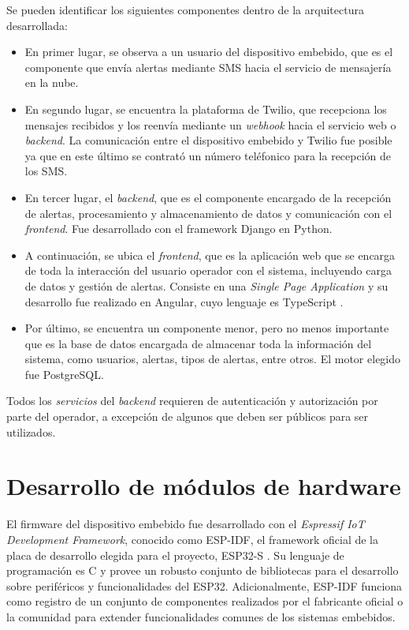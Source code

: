 Se pueden identificar los siguientes componentes dentro de la arquitectura desarrollada:
\begin{itemize}
	\item En primer lugar, se observa a un usuario del dispositivo embebido, que es el componente que envía alertas mediante SMS hacia el servicio de mensajería en la nube.
	\item En segundo lugar, se encuentra la plataforma de Twilio, que recepciona los mensajes recibidos y los reenvía mediante un \textit{webhook} hacia el servicio web o \textit{backend}. La comunicación entre el dispositivo embebido y Twilio fue posible ya que en este último se contrató un número teléfonico para la recepción de los SMS. 
	\item En tercer lugar, el \textit{backend}, que es el componente encargado de la recepción de alertas, procesamiento y almacenamiento de datos y comunicación con el \textit{frontend}. Fue desarrollado con el framework Django en Python.
	\item A continuación, se ubica el \textit{frontend}, que es la aplicación web que se encarga de toda la interacción del usuario operador con el sistema, incluyendo carga de datos y gestión de alertas. Consiste en una \textit{Single Page Application } y su desarrollo fue realizado en Angular, cuyo lenguaje es TypeScript \citep{ANGULAR:1}.
	\item Por último, se encuentra un componente menor, pero no menos importante que es la base de datos encargada de almacenar toda la información del sistema, como usuarios, alertas, tipos de alertas, entre otros. El motor elegido fue PostgreSQL.
\end{itemize}

Todos los \textit{servicios} del \textit{backend} requieren de autenticación y autorización por parte del operador, a excepción de algunos que deben ser públicos para ser utilizados.
   
\section{Desarrollo de módulos de hardware}

El firmware del dispositivo embebido fue desarrollado con el \textit{Espressif IoT Development Framework}, conocido como ESP-IDF, el framework oficial de la placa de desarrollo elegida para el proyecto, ESP32-S \citep{ESPIDF:1}. Su lenguaje de programación es C y provee un robusto conjunto de bibliotecas para el desarrollo sobre periféricos y funcionalidades del ESP32. Adicionalmente, ESP-IDF funciona como registro de un conjunto de componentes realizados por el fabricante oficial o la comunidad para extender funcionalidades comunes de los sistemas embebidos. 

